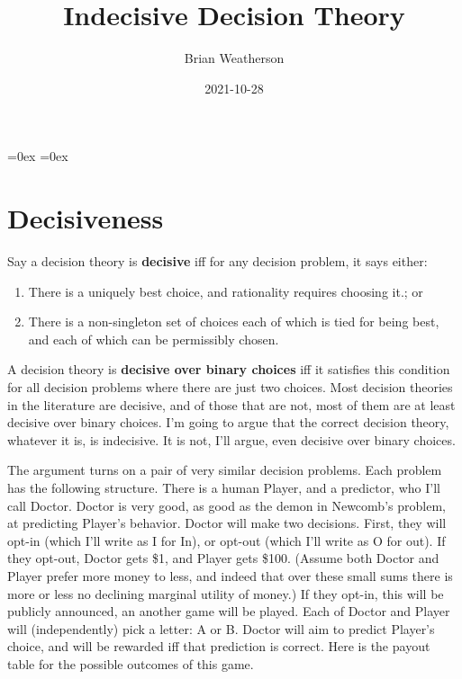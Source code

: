 \documentclass[
  12pt,
]{article}
\title{Indecisive Decision Theory}
\author{Brian Weatherson}
\date{2021-10-28}
\providecommand{\tightlist}{%
  \setlength{\itemsep}{0pt}\setlength{\parskip}{0pt}}
\begin{document}
\maketitle

\setlength\heavyrulewidth{0ex}
\setlength\lightrulewidth{0.08ex}

\aboverulesep=0ex
\belowrulesep=0ex
\renewcommand{\arraystretch}{1.2}
\hypersetup{hidelinks}

\renewcommand\refname{References}

\captionsetup{labelformat=empty, font = small, font = bf, position = below}

\hypertarget{decisiveness}{%
\section{Decisiveness}\label{decisiveness}}

Say a decision theory is \textbf{decisive} iff for any decision problem,
it says either:

\begin{enumerate}
\def\labelenumi{\arabic{enumi}.}
\tightlist
\item
  There is a uniquely best choice, and rationality requires choosing
  it.; or
\item
  There is a non-singleton set of choices each of which is tied for
  being best, and each of which can be permissibly chosen.
\end{enumerate}

A decision theory is \textbf{decisive over binary choices} iff it
satisfies this condition for all decision problems where there are just
two choices. Most decision theories in the literature are decisive, and
of those that are not, most of them are at least decisive over binary
choices. I'm going to argue that the correct decision theory, whatever
it is, is indecisive. It is not, I'll argue, even decisive over binary
choices.

The argument turns on a pair of very similar decision problems. Each
problem has the following structure. There is a human Player, and a
predictor, who I'll call Doctor. Doctor is very good, as good as the
demon in Newcomb's problem, at predicting Player's behavior. Doctor will
make two decisions. First, they will opt-in (which I'll write as I for
In), or opt-out (which I'll write as O for out). If they opt-out, Doctor
gets \$1, and Player gets \$100. (Assume both Doctor and Player prefer
more money to less, and indeed that over these small sums there is more
or less no declining marginal utility of money.) If they opt-in, this
will be publicly announced, an another game will be played. Each of
Doctor and Player will (independently) pick a letter: A or B. Doctor
will aim to predict Player's choice, and will be rewarded iff that
prediction is correct. Here is the payout table for the possible
outcomes of this game.
\end{document}
